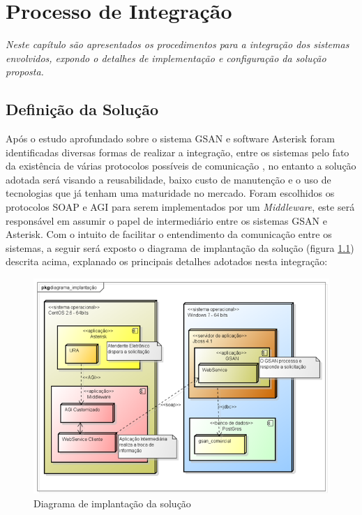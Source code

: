 \chapter[Processo de Integração]{\textbf{P}rocesso de \textbf{I}ntegração}

\textit{Neste capítulo são apresentados os procedimentos para a integração dos sistemas envolvidos, expondo o detalhes de implementação e configuração da solução proposta.}


\section{Definição da Solução}

Após o estudo aprofundado sobre o sistema GSAN e software Asterisk foram identificadas diversas formas de realizar a integração, entre os sistemas pelo fato da existência de várias protocolos possíveis de comunicação , no entanto a solução adotada será visando a reusabilidade, baixo custo de manutenção e o uso de tecnologias que já tenham uma maturidade no mercado. Foram escolhidos os protocolos SOAP e AGI para serem implementados por um \textit{Middleware}, este será responsável em assumir o papel de intermediário entre os sistemas GSAN e Asterisk. Com o intuito de facilitar o entendimento da comunicação entre os sistemas, a seguir será exposto o diagrama de implantação da solução (figura \ref{figura:diagramaImplantacao}) descrita acima, explanado os principais detalhes adotados nesta integração:


\begin{figure}[H]
	\centering
	\caption{Diagrama de implantação da solução}
	\label{figura:diagramaImplantacao}
	\includegraphics{figuras/diagrama_implantacao.png}
\end{figure}


